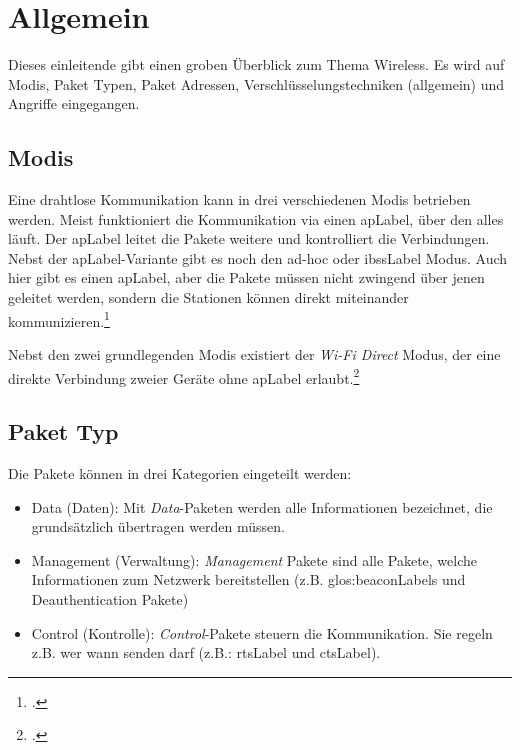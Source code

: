 
\chapter{Allgemein}
\label{ch:general}
Dieses einleitende  gibt einen groben Überblick zum Thema Wireless. Es wird auf Modis, Paket Typen, Paket Adressen, Verschlüsselungstechniken (allgemein) und Angriffe eingegangen.

\section{Modis}
Eine drahtlose Kommunikation kann in drei verschiedenen Modis betrieben werden.
Meist funktioniert die Kommunikation via einen \gls{apLabel}, über den alles läuft. Der \gls{apLabel} leitet die Pakete weitere und kontrolliert die Verbindungen.
Nebst der \gls{apLabel}-Variante gibt es noch den ad-hoc oder \gls{ibssLabel} Modus. Auch hier gibt es einen \gls{apLabel}, aber die Pakete müssen nicht zwingend über jenen geleitet werden, sondern die Stationen können direkt miteinander kommunizieren.\footcite[][38]{WrightCache201503}

Nebst den zwei grundlegenden Modis existiert der \textit{Wi-Fi Direct} Modus, der eine direkte Verbindung zweier Geräte ohne \gls{apLabel} erlaubt.\footcite{WiFi_Direct_Wikipedia_the_free_encyclopedia_2015-04-17}

\section{Paket Typ}
Die Pakete können in drei Kategorien eingeteilt werden:
\begin{itemize}
	\item Data (Daten): Mit \textit{Data}-Paketen werden alle Informationen bezeichnet, die grundsätzlich übertragen werden müssen.
	\item Management (Verwaltung): \textit{Management} Pakete sind alle Pakete, welche Informationen zum Netzwerk bereitstellen (z.B. \glspl{glos:beaconLabel} und Deauthentication Pakete)
	\item Control (Kontrolle): \textit{Control}-Pakete steuern die Kommunikation. Sie regeln z.B. wer wann senden darf (z.B.: \gls{rtsLabel} und \gls{ctsLabel}).
\end{itemize}

